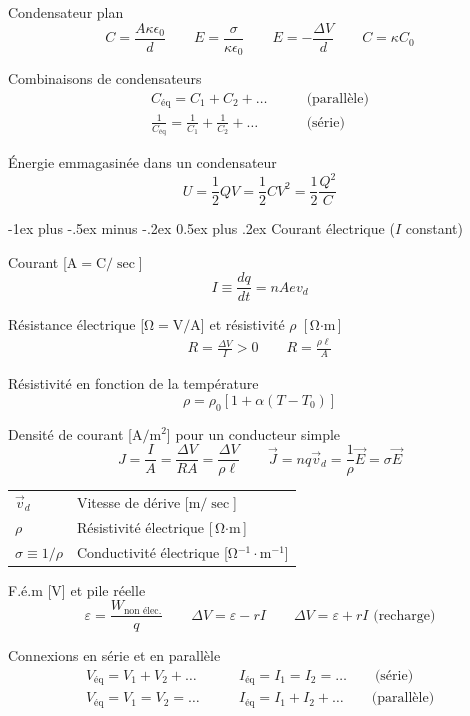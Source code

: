 \documentclass[10pt,landscape]{article}
\makeatletter
\renewcommand{\section}{\@startsection{section}{1}{0mm}%
                                {-1ex plus -.5ex minus -.2ex}%
                                {0.5ex plus .2ex}%
                                {\normalfont\large\bfseries}}
\newcommand{\halfline}{\vspace{0.5em}}
\newcommand{\tableindent}{\hspace{1.5em}}
\makeatother
\begin{document}
\begin{multicols}{3}
Condensateur plan \[ C = \frac{A\kappa\epsilon_0}{d} 
\qquad 
E = \frac{\sigma}{\kappa\epsilon_0}
\qquad
E =  -\frac{\Delta V}{d} 
\qquad
C = \kappa C_0 \]

Combinaisons de condensateurs \begin{align*}
C_\text{éq} = C_1 + C_2 + \dots  \qquad &\text{(parallèle)} \\
\frac{1}{C_\text{éq}} = \frac{1}{C_1} + \frac{1}{C_2} + \dots \qquad &\text{(série)}
\end{align*}


Énergie emmagasinée dans un condensateur
\[ U = \frac{1}{2} QV = \frac{1}{2} CV^2 = \frac{1}{2}\frac{Q^2}{C} \]


\hrulefill

\section{Courant électrique ($I$ constant)}

Courant [$\si{\ampere} = \si{\coulomb}/\si{\sec}$]
\[ I \equiv \frac{dq}{dt} = n A e v_d \]

Résistance électrique [$\si{\ohm} = \si{\volt/\ampere}$] et résistivité $\rho$ [$\si{\ohm\cdot\meter}$]
\begin{gather*}
R = \frac{\Delta V}{I}  > 0   \qquad 
R = \frac{\rho \ell}{A}
\end{gather*}

Résistivité en fonction de la température
\[ \rho = \rho_0[1 + \alpha(T-T_0)] \]

Densité de courant [$\si{\ampere/\meter^2}$] pour un conducteur simple
\[ J = \frac{I}{A} = \frac{\Delta V}{RA} =  \frac{\Delta V}{\rho \ell} 
\qquad \vec{J} = n q \vec{v}_d  = \frac{1}{\rho}\vec{E} = \sigma \vec{E} \]

\begin{tabular}{@{\tableindent}ll@{}}
	$\vec{v}_d$ & Vitesse de dérive [$\si{\metre/\sec}$] \\
	$\rho$ & Résistivité électrique  [$\si{\ohm\cdot\meter}$] \\
	$\sigma \equiv 1/\rho$ & Conductivité électrique [$\si{\ohm^{-1}\cdot\meter^{-1}}$] \\
\end{tabular}
\halfline

F.é.m [\si{\volt}] et pile réelle
\[ \varepsilon = \frac{W_\text{non élec.}}{q} \qquad
\Delta V = \varepsilon - rI 
\qquad \Delta V = \varepsilon + rI \text{ (recharge)}\]

Connexions en série et en parallèle
\begin{align*}
	V_\text{éq} = V_1 + V_2 + \dots  & \qquad
		I_\text{éq} = I_1 = I_2 = \dots   \qquad
		\text{(série)} \\
	V_\text{éq} = V_1 = V_2 = \dots  & \qquad
		I_\text{éq} = I_1 + I_2 + \dots   \qquad
		\text{(parallèle)}
\end{align*}


\end{multicols}
\end{document}

